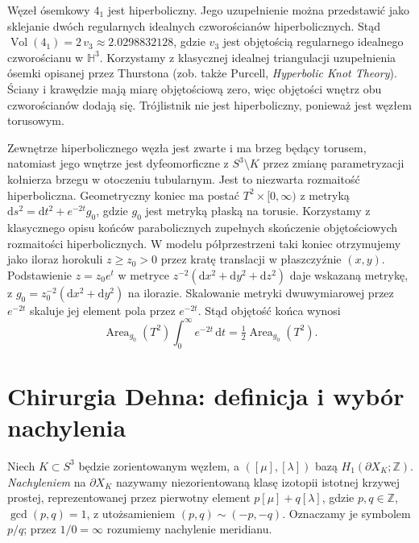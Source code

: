 \begin{przyklad}
Węzeł ósemkowy $4_1$ jest hiperboliczny. Jego uzupełnienie
można przedstawić jako sklejanie dwóch regularnych idealnych
czworościanów hiperbolicznych. Stąd
$\operatorname{Vol}(4_1)=2\,v_3\approx2.0298832128$,
gdzie $v_3$ jest objętością regularnego idealnego
czworościanu w $\mathbb H^3$. Korzystamy z klasycznej
idealnej triangulacji uzupełnienia ósemki opisanej
przez Thurstona (zob. także Purcell,
\emph{Hyperbolic Knot Theory}). Ściany i krawędzie
mają miarę objętościową zero, więc objętości wnętrz
obu czworościanów dodają się. Trójlistnik nie jest
hiperboliczny, ponieważ jest węzłem torusowym.
\end{przyklad}

\begin{uwaga}
Zewnętrze hiperbolicznego węzła jest zwarte i ma brzeg
będący torusem, natomiast jego wnętrze jest
dyfeomorficzne z $S^3\setminus K$ przez zmianę
parametryzacji kołnierza brzegu w otoczeniu tubularnym.
Jest to niezwarta rozmaitość hiperboliczna. Geometryczny
koniec ma postać $T^2\times[0,\infty)$ z metryką
$\mathrm ds^2=\mathrm dt^2+e^{-2t}g_0$,
gdzie $g_0$ jest metryką płaską na torusie.
Korzystamy z klasycznego opisu końców parabolicznych
zupełnych skończenie objętościowych rozmaitości
hiperbolicznych. W modelu półprzestrzeni taki koniec
otrzymujemy jako iloraz horokuli $z\geq z_0>0$
przez kratę translacji w płaszczyźnie $(x,y)$.
Podstawienie $z=z_0e^t$ w metryce
$z^{-2}(\mathrm dx^2+\mathrm dy^2+\mathrm dz^2)$
daje wskazaną metrykę, z
$g_0=z_0^{-2}(\mathrm dx^2+\mathrm dy^2)$ na ilorazie.
Skalowanie metryki dwuwymiarowej przez $e^{-2t}$
skaluje jej element pola przez $e^{-2t}$.
Stąd objętość końca wynosi
\[
\operatorname{Area}_{g_0}(T^2)
\int_0^\infty e^{-2t}\,\mathrm dt
=\tfrac12\operatorname{Area}_{g_0}(T^2).
\]
\end{uwaga}

\section{Chirurgia Dehna: definicja i wybór nachylenia}
\label{sec:kt-dehn}

\begin{definicja}
Niech $K\subset S^3$ będzie zorientowanym węzłem, a
$([\mu],[\lambda])$ bazą $H_1(\partial X_K;\mathbb Z)$.
\emph{Nachyleniem} na $\partial X_K$ nazywamy niezorientowaną
klasę izotopii istotnej krzywej prostej, reprezentowanej przez
pierwotny element $p[\mu]+q[\lambda]$, gdzie
$p,q\in\mathbb Z$, $\gcd(p,q)=1$, z utożsamieniem
$(p,q)\sim(-p,-q)$. Oznaczamy je symbolem $p/q$;
przez $1/0=\infty$ rozumiemy nachylenie meridianu.
\end{definicja}

